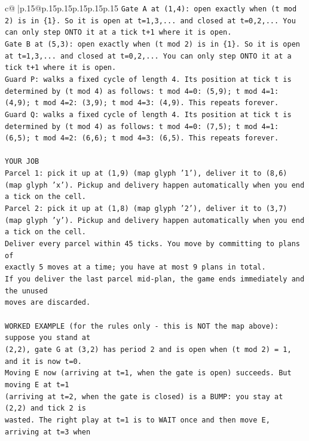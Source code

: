 \documentclass{article}
\begin{document}
{\begin{supertabular}{c@{$\;$}|p{.15\linewidth}@{}p{.15\linewidth}p{.15\linewidth}p{.15\linewidth}p{.15\linewidth}p{.15\linewidth}}
{{{\texttt{Gate A at (1,4): open exactly when (t mod 2) is in \{1\}. So it is open at t=1,3,... and closed at t=0,2,... You can only step ONTO it at a tick t+1 where it is open.} \\
\texttt{Gate B at (5,3): open exactly when (t mod 2) is in \{1\}. So it is open at t=1,3,... and closed at t=0,2,... You can only step ONTO it at a tick t+1 where it is open.} \\
\texttt{Guard P: walks a fixed cycle of length 4. Its position at tick t is determined by (t mod 4) as follows: t mod 4=0: (5,9); t mod 4=1: (4,9); t mod 4=2: (3,9); t mod 4=3: (4,9). This repeats forever.} \\
\texttt{Guard Q: walks a fixed cycle of length 4. Its position at tick t is determined by (t mod 4) as follows: t mod 4=0: (7,5); t mod 4=1: (6,5); t mod 4=2: (6,6); t mod 4=3: (6,5). This repeats forever.} \\
\\ 
\texttt{YOUR JOB} \\
\texttt{Parcel 1: pick it up at (1,9) (map glyph '1'), deliver it to (8,6) (map glyph 'x'). Pickup and delivery happen automatically when you end a tick on the cell.} \\
\texttt{Parcel 2: pick it up at (1,8) (map glyph '2'), deliver it to (3,7) (map glyph 'y'). Pickup and delivery happen automatically when you end a tick on the cell.} \\
\texttt{Deliver every parcel within 45 ticks. You move by committing to plans of} \\
\texttt{exactly 5 moves at a time; you have at most 9 plans in total.} \\
\texttt{If you deliver the last parcel mid{-}plan, the game ends immediately and the unused} \\
\texttt{moves are discarded.} \\
\\ 
\texttt{WORKED EXAMPLE (for the rules only {-} this is NOT the map above): suppose you stand at} \\
\texttt{(2,2), gate G at (3,2) has period 2 and is open when (t mod 2) = 1, and it is now t=0.} \\
\texttt{Moving E now (arriving at t=1, when the gate is open) succeeds. But moving E at t=1} \\
\texttt{(arriving at t=2, when the gate is closed) is a BUMP: you stay at (2,2) and tick 2 is} \\
\texttt{wasted. The right play at t=1 is to WAIT once and then move E, arriving at t=3 when} \\
}}}
\end{supertabular}}
\end{document}
